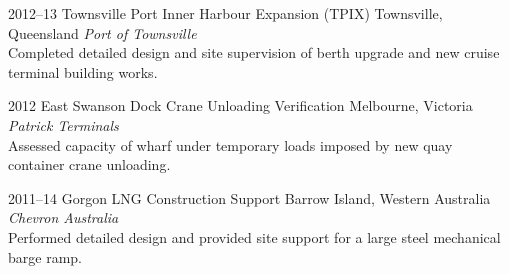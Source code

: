 \begin{entrylist}
\entry%
{2012--13}
{Townsville Port Inner Harbour Expansion (TPIX)}
{Townsville, Queensland}
{\emph{Port of Townsville} \\
Completed detailed design and site supervision of berth upgrade and new cruise terminal building works.}
\end{entrylist}

\begin{entrylist}
\entry%
{2012}
{East Swanson Dock Crane Unloading Verification}
{Melbourne, Victoria}
{\emph{Patrick Terminals} \\
Assessed capacity of wharf under temporary loads imposed by new quay container crane unloading.}
\end{entrylist}

\begin{entrylist}
\entry%
{2011--14}
{Gorgon LNG Construction Support}
{Barrow Island, Western Australia}
{\emph{Chevron Australia} \\
Performed detailed design and provided site support for a large steel mechanical barge ramp.}
\end{entrylist}

